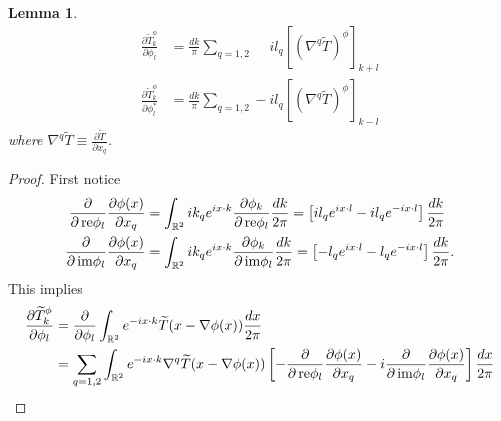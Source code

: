 \documentclass[noinfoline]{imsart}
\newtheorem{lemma}{Lemma}
\newcommand{\re}{\text{\,\rm re}}
\newcommand{\im}{\text{\,\rm im}}
\begin{document}
\begin{lemma} 
\label{partialconj}
\begin{align}
\frac{\partial \widetilde T^\phi_k}{\partial \phi_{ l} }  &= \frac{  dk}{\pi}\sum_{q=1,2} \phantom{-}il_q[(\nabla^q\widetilde T)^\phi]_{k+l} \\
\frac{\partial \widetilde T^\phi_k}{\partial \phi^*_{ l} }  & = \frac{ dk }{\pi}\sum_{q=1,2} -il_q [(\nabla^q\widetilde T)^\phi]_{k-l}
\end{align}
where $\nabla^q \widetilde T\equiv \frac{\partial \widetilde T}{\partial x_q}$.
\end{lemma}
\begin{proof}
First notice
\begin{align}
\label{partial1}
\frac{\partial}{\partial \re \phi_{ l}}\frac{\partial\phi(x)}{ \partial x_q}  &= \int_{\Bbb R^2} i  k_q e^{ix \cdot k} \frac{\partial \phi_k}{\partial \re \phi_l }  \frac{d k}{2\pi} 
=\left[i  l_q e^{ix \cdot  l}  - i  l_q e^{-i x \cdot  l}  \right] \frac{d k}{2\pi}   \\
\label{partial2}
\frac{\partial}{\partial \im \phi_{ l}}\frac{\partial\phi(x)}{ \partial x_q}  &= \int_{\Bbb R^2} i  k_q e^{ix \cdot  k} \frac{\partial \phi_ k}{\partial \im \phi_{l} }  \frac{d k}{2\pi} 
=\left[-  l_q e^{ix \cdot  l}  -  l_q e^{-i x \cdot  l}  \right] \frac{d k}{2\pi}.  
\end{align}
This implies
\begin{align}
\nonumber \frac{\partial \widetilde T^\phi_k}{\partial \phi_{ l} } 
&=  \frac{\partial}{\partial  \phi_{ l} } \int_{\Bbb R^2}  e^{-ix \cdot k}\widetilde T(x-\nabla \phi(x))\frac{dx}{2\pi} \\
\nonumber &= \sum_{q=1,2}  \int_{\Bbb R^2} e^{-ix \cdot k} \nabla^q\widetilde T(x-\nabla \phi(x))\left[ -\frac{\partial}{\partial \re \phi_{ l}}\frac{\partial\phi(x)}{ \partial x_q} -i  \frac{\partial}{\partial \im \phi_{ l}}\frac{\partial\phi(x)}{ \partial x_q}\right]\frac{dx}{2\pi}\\

\end{align}
\end{proof}
\end{document}
